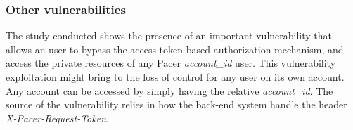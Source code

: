 		\subsubsection{Other vulnerabilities}
			\par The study conducted shows the presence of an important vulnerability that allows an user to bypass the access-token based authorization mechanism, and access the private resources of any Pacer \textit{account\_id} user. \newline
			This vulnerability exploitation might bring to the loss of control for any user on its own account. Any account can be accessed by simply having the relative \textit{account\_id}. \newline
			The source of the vulnerability relies in how the back-end system handle the header \textit{X-Pacer-Request-Token}.
		
\newpage